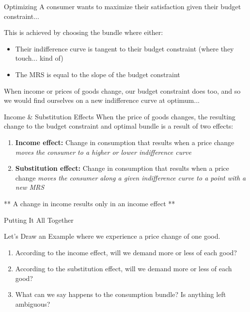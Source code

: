 \documentclass[compress]{beamer}
\begin{document}
\begin{frame}{Optimizing}
A consumer wants to maximize their satisfaction given their budget constraint... 

\begin{block}{This is achieved by choosing the bundle where either:}
    \begin{itemize}
        \item Their indifference curve is tangent to their budget constraint (where they touch... kind of)
        \item The MRS is equal to the slope of the budget constraint
    \end{itemize}
\end{block}

When income or prices of goods change, our budget constraint does too, and so we would find ourselves on a new indifference curve at optimum... 
\end{frame}

\begin{frame}{Income \& Substitution Effects}
    When the price of goods changes, the resulting change to the budget constraint and optimal bundle is a result of two effects:
    \begin{enumerate}
        \item \textbf{Income effect:} Change in consumption that results when a price change \textit{moves the consumer to a higher or lower indifference curve}
        \item \textbf{Substitution effect:} Change in consumption that results when a price change \textit{moves the consumer along a given indifference curve to a point with a new MRS}
    \end{enumerate}

    \vspace{4mm}

\begin{center}
    ** A change in income results only in an income effect **
    \end{center}
\end{frame}

\begin{frame}{Putting It All Together}

    Let's Draw an Example where we experience a price change of one good.
    \begin{enumerate}
        \item According to the income effect, will we demand more or less of each good?
        \item According to the substitution effect, will we demand more or less of each good?
        \item What can we say happens to the consumption bundle? Is anything left ambiguous?
    \end{enumerate}

\end{frame}
\end{document}
